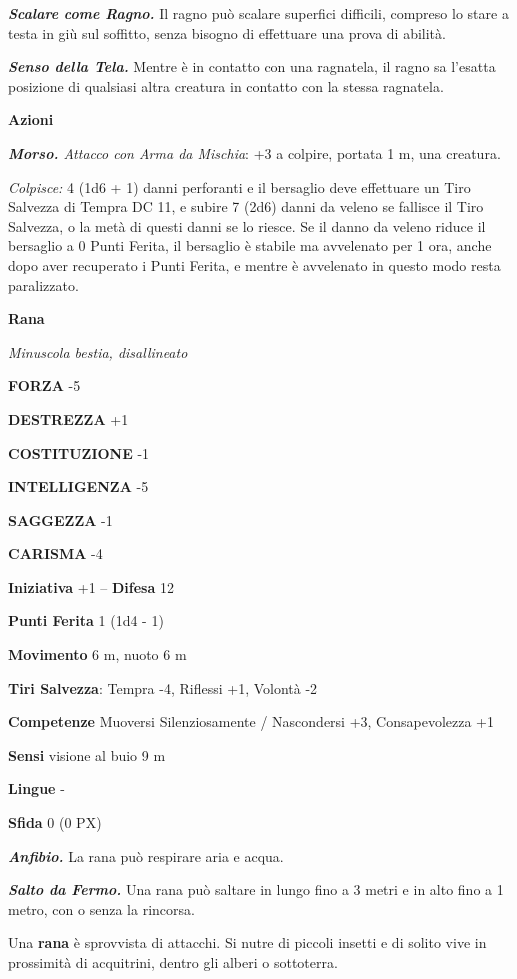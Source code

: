 \begin{multicols}{2}
	\textit{\textbf{Scalare come Ragno.}} Il ragno può scalare superfici difficili, compreso lo stare a testa in giù sul soffitto, senza bisogno di effettuare una prova di abilità.

	\textit{\textbf{Senso della Tela.}} Mentre è in contatto con una ragnatela, il ragno sa l'esatta posizione di qualsiasi altra creatura in contatto con la stessa ragnatela.

	\textbf{Azioni}

	\textit{\textbf{Morso.} Attacco con Arma da Mischia}: +3 a colpire, portata 1 m, una creatura.

	\textit{Colpisce:} 4 (1d6 + 1) danni perforanti e il bersaglio deve effettuare un Tiro Salvezza di Tempra DC 11, e subire 7 (2d6) danni da veleno se fallisce il Tiro Salvezza, o la metà di questi danni se lo riesce. Se il danno da veleno riduce il bersaglio a 0 Punti Ferita, il bersaglio è stabile ma avvelenato per 1 ora, anche dopo aver recuperato i Punti Ferita, e mentre è avvelenato in questo modo resta paralizzato.

	\medskip\textbf{Rana}

	\textit{Minuscola bestia, disallineato}

	\textbf{FORZA} -5

	\textbf{DESTREZZA} +1

	\textbf{COSTITUZIONE} -1

	\textbf{INTELLIGENZA} -5

	\textbf{SAGGEZZA} -1

	\textbf{CARISMA} -4

	\textbf{Iniziativa} +1 -- \textbf{Difesa} 12

	\textbf{Punti Ferita} 1 (1d4 - 1)

	\textbf{Movimento} 6 m, nuoto 6 m

	\textbf{Tiri Salvezza}: Tempra -4, Riflessi +1, Volontà -2

	\textbf{Competenze} Muoversi Silenziosamente / Nascondersi +3, Consapevolezza +1

	\textbf{Sensi} visione al buio 9 m

	\textbf{Lingue} -

	\textbf{Sfida} 0 (0 PX)

	\textit{\textbf{Anfibio.}} La rana può respirare aria e acqua.

	\textit{\textbf{Salto da Fermo.}} Una rana può saltare in lungo fino a 3 metri e in alto fino a 1 metro, con o senza la rincorsa.

	Una \textbf{rana} è sprovvista di attacchi. Si nutre di piccoli insetti e di solito vive in prossimità di acquitrini, dentro gli alberi o sottoterra.


\end{multicols}
